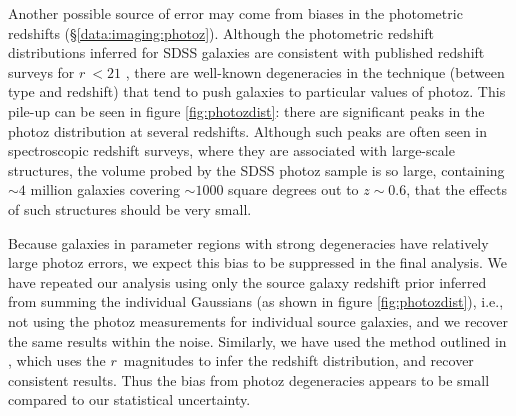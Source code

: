 \documentclass{emulateapj}
\newcommand{\rmag}{$r$}
\begin{document}
Another possible source of error may come from biases in the photometric
redshifts (\S \ref{data:imaging:photoz}).  Although the photometric 
redshift distributions
inferred for SDSS galaxies are consistent with published redshift surveys for
\rmag$~<21$ \citep{Csabai2003}, there are well-known degeneracies 
in the technique (between type and redshift) that tend to 
push galaxies to particular values of photoz.  This pile-up 
can be seen in figure
\ref{fig:photozdist}: there are significant peaks in the photoz distribution
at several redshifts. Although such peaks are often seen in spectroscopic 
redshift surveys, where they are associated with large-scale structures, 
the volume probed by the SDSS photoz sample is so large, 
containing $\sim 4$ million galaxies covering $\sim 1000$ 
square degrees out to $z \sim 0.6$,  that the effects of such 
structures should be very small. 

Because galaxies in parameter regions 
with strong degeneracies have relatively large photoz errors,
we expect this bias to be suppressed in the final analysis. We have repeated
our analysis using only the source galaxy 
redshift prior inferred from summing the individual
Gaussians (as shown in figure \ref{fig:photozdist}), i.e., not 
using the photoz measurements for individual source galaxies, 
and we recover the same
results within the noise.  Similarly, we have used the method outlined in
\citet{Mckay02}, which uses the \rmag\ magnitudes to infer the redshift
distribution, and recover consistent results. 
Thus the bias from photoz degeneracies appears to be small compared to our
statistical uncertainty.



\newpage





\newpage

\end{document}
